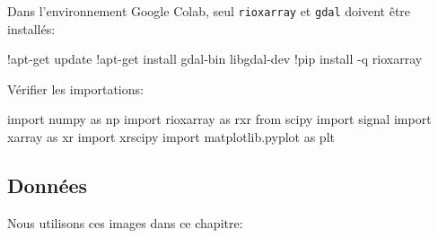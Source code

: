 \documentclass[
  11pt,
  letterpaper,
  open=any,
  twoside=false,
  french]{scrbook}
\newenvironment{Shaded}{\begin{snugshade}}{\end{snugshade}}
\newcommand{\BuiltInTok}[1]{\textcolor[rgb]{0.00,0.23,0.31}{#1}}
\newcommand{\ImportTok}[1]{\textcolor[rgb]{0.00,0.46,0.62}{#1}}
\newcommand{\NormalTok}[1]{\textcolor[rgb]{0.00,0.23,0.31}{#1}}
\newcommand{\OperatorTok}[1]{\textcolor[rgb]{0.37,0.37,0.37}{#1}}
\begin{document}
Dans l'environnement Google Colab, seul \texttt{rioxarray} et
\texttt{gdal} doivent être installés:

\begin{Shaded}
\begin{Highlighting}[]
\OperatorTok{!}\NormalTok{apt}\OperatorTok{{-}}\NormalTok{get update}
\OperatorTok{!}\NormalTok{apt}\OperatorTok{{-}}\NormalTok{get install gdal}\OperatorTok{{-}}\BuiltInTok{bin}\NormalTok{ libgdal}\OperatorTok{{-}}\NormalTok{dev}
\OperatorTok{!}\NormalTok{pip install }\OperatorTok{{-}}\NormalTok{q rioxarray}
\end{Highlighting}
\end{Shaded}

Vérifier les importations:

\begin{Shaded}
\begin{Highlighting}[]
\ImportTok{import}\NormalTok{ numpy }\ImportTok{as}\NormalTok{ np}
\ImportTok{import}\NormalTok{ rioxarray }\ImportTok{as}\NormalTok{ rxr}
\ImportTok{from}\NormalTok{ scipy }\ImportTok{import}\NormalTok{ signal}
\ImportTok{import}\NormalTok{ xarray }\ImportTok{as}\NormalTok{ xr}
\ImportTok{import}\NormalTok{ xrscipy}
\ImportTok{import}\NormalTok{ matplotlib.pyplot }\ImportTok{as}\NormalTok{ plt}
\end{Highlighting}
\end{Shaded}

\subsection{Données}\label{donnuxe9es}

Nous utilisons ces images dans ce chapitre:
\end{document}
